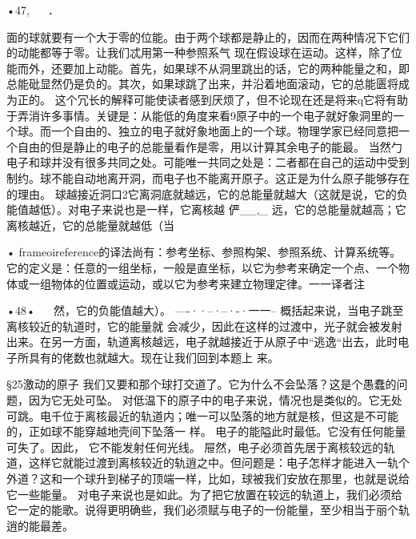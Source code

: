 •47,
  
．

面的球就要有一个大于零的位能。由于两个球都是静止的，因而在两种情况下它们的动能都等于零。让我们忒用第一种参照系气
现在假设球在运动。这样，除了位能而外，还要加上动能。首先，如果球不从洞里跳出的话，它的两种能量之和，即总能砒显然仍是负的。其次，如果球跳了出来，并沿着地面滚动，它的总能匮将成为正的。
这个冗长的解释可能使读者感到厌烦了，但不论现在还是将来q它将有助于弄消许多事情。关键是：从能低的角度来看9原子中的一个电子就好象洞里的一个球。而一个自由的、独立的电子就好象地面上的一个球。物理学家已经同意把一个自由的但是静止的电子的总能量看作是零，用以计算其余电子的能最。
当然勹电子和球并没有很多共同之处。可能唯一共同之处是：二者都在自己的运动中受到制约。球不能自动地离开洞，而电子也不能离开原子。这正是为什么原子能够存在的理由。
球越接近洞口2它离洞底就越远，它的总能量就越大（这就是说，它的负能值越低）。对电子来说也是一样，它离核越
俨__,_
远，它的总能量就越高；它离核越近，它的总能量就越低（当

 

 
 
 

 
•	frameoireference的译法尚有：参考坐标、参照构架、参照系统、计算系统等。它的定义是：任意的一组坐标，一般是直坐标，以它为参考来确定一个点、一个物体或一组物体的位置或运动，或以它为参考来建立物理定律。一一译者注

•48•
  
然，它的负能值越大）。
----··--·--·-·一一--
概括起来说，当电子跳至离核较近的轨道时，它的能量就
会减少，因此在这样的过渡中，光子就会被发射出来。在另一方面，轨道离核越远，电子就越接近于从原子中“逃逸“出去，此时电子所具有的佬数也就越大。现在让我们回到本题上
来。

§25激动的原子
我们又要和那个球打交道了。它为什么不会坠落？这是个愚蠢的问题，因为它无处可坠。
对低温下的原子中的电子来说，情况也是类似的。它无处可跳。电千位于离核最近的轨道内；唯一可以坠落的地方就是核，但这是不可能的，正如球不能穿越地壳间下坠落一
样。
电子的能隘此时最低。它没有任何能量可失了。因此，
它不能发射任何光线。
屉然，电子必须首先居于离核较远的轨道，这样它就能过渡到离核较近的轨逍之中。但问题是：电子怎样才能进入一轨个外道？这和一个球升到梯子的顶端一样，比如，球被我们安放在那里，也就是说给它一些能量。
对电子来说也是如此。为了把它放置在较远的轨道上，我们必须给它一定的能歌。说得更明确些，我们必须赋与电子的一份能量，至少相当于丽个轨逍的能最差。

